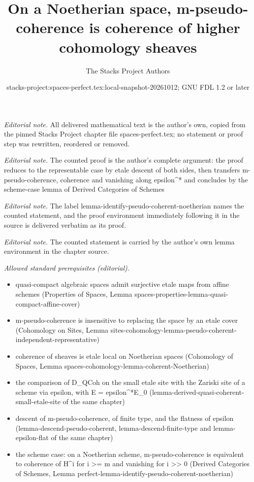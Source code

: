\documentclass[10pt,a4paper]{amsart}
\title{On a Noetherian space, m-pseudo-coherence is coherence of higher cohomology sheaves}
\author{The Stacks Project Authors}
\date{stacks-project:spaces-perfect.tex:local-snapshot-20261012; GNU FDL 1.2 or later}
\theoremstyle{plain}
\theoremstyle{definition}
\theoremstyle{remark}
\numberwithin{equation}{subsection}
\begin{document}
\maketitle
\noindent\textit{Editorial note.} All delivered mathematical text is the author's own, copied from the pinned Stacks Project chapter file spaces-perfect.tex; no statement or proof step was rewritten, reordered or removed.\par\medskip
\noindent\textit{Editorial note.} The counted proof is the author's complete argument: the proof reduces to the representable case by etale descent of both sides, then transfers m-pseudo-coherence, coherence and vanishing along epsilon\textasciicircum{}* and concludes by the scheme-case lemma of Derived Categories of Schemes\par\medskip
\noindent\textit{Editorial note.} The label lemma-identify-pseudo-coherent-noetherian names the counted statement, and the proof environment immediately following it in the source is delivered verbatim as its proof.\par\medskip
\noindent\textit{Editorial note.} The counted statement is carried by the author's own lemma environment in the chapter source.\par\medskip
\noindent\textit{Allowed standard prerequisites (editorial).}\begin{itemize}
\item quasi-compact algebraic spaces admit surjective etale maps from affine schemes (Properties of Spaces, Lemma spaces-properties-lemma-quasi-compact-affine-cover)
\item m-pseudo-coherence is insensitive to replacing the space by an etale cover (Cohomology on Sites, Lemma sites-cohomology-lemma-pseudo-coherent-independent-representative)
\item coherence of sheaves is etale local on Noetherian spaces (Cohomology of Spaces, Lemma spaces-cohomology-lemma-coherent-Noetherian)
\item the comparison of D\_QCoh on the small etale site with the Zariski site of a scheme via epsilon, with E = epsilon\textasciicircum{}*E\_0 (lemma-derived-quasi-coherent-small-etale-site of the same chapter)
\item descent of m-pseudo-coherence, of finite type, and the flatness of epsilon (lemma-descend-pseudo-coherent, lemma-descend-finite-type and lemma-epsilon-flat of the same chapter)
\item the scheme case: on a Noetherian scheme, m-pseudo-coherence is equivalent to coherence of H\textasciicircum{}i for i >= m and vanishing for i >> 0 (Derived Categories of Schemes, Lemma perfect-lemma-identify-pseudo-coherent-noetherian)
\end{itemize}\medskip
\end{document}
